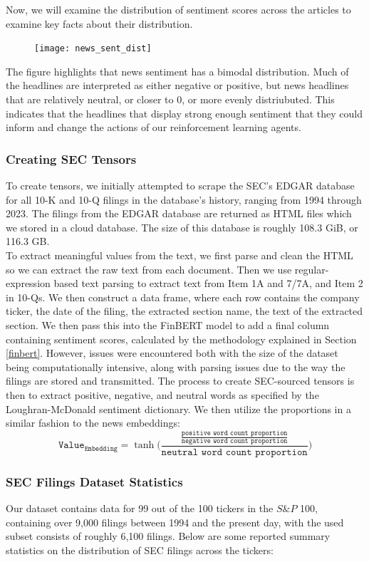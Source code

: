 Now, we will examine the distribution of sentiment scores across the articles to examine key facts about their distribution.


\begin{figure}
\texttt{[image: news\_sent\_dist]}
\end{figure}

The figure highlights that news sentiment has a bimodal distribution. Much of the headlines are interpreted as either negative or positive, but news headlines that are relatively neutral, or closer to 0, or more evenly distriubuted. 
This indicates that the headlines that display strong enough sentiment that they could inform and change the actions of our reinforcement learning agents.

\subsubsection{Creating SEC Tensors}
To create tensors, we initially attempted to scrape the SEC's EDGAR database for all 10-K and 10-Q filings in the database's history, ranging from 1994 through 2023. The filings from the EDGAR database are returned as HTML files which we stored in a cloud database. The size of this database is roughly 108.3 GiB, or 116.3 GB.\\
To extract meaningful values from the text, we first parse and clean the HTML so we can extract the raw text from each document. Then we use regular-expression based text parsing to extract text from Item 1A and 7/7A, and Item 2 in 10-Qs. We then construct a data frame, where each row contains the company ticker, the date of the filing, the extracted section name, the text of the extracted section. We then pass this into the FinBERT model to add a final column containing sentiment scores, calculated by the methodology explained in Section \ref{finbert}. However, issues were encountered both with the size of the dataset being computationally intensive, along with parsing issues due to the way the filings are stored and transmitted.
The process to create SEC-sourced tensors is then to extract positive, negative, and neutral words as specified by the Loughran-McDonald sentiment dictionary. We then utilize the proportions in a similar fashion to the news embeddings:
\[\texttt{Value}_{\texttt{Embedding}} = \tanh\Biggl( \frac{\frac{\texttt{positive word count proportion}}{\texttt{negative word count proportion}}}{\texttt{neutral word count proportion}} \Biggr)\]
\subsubsection{SEC Filings Dataset Statistics}
Our dataset contains data for 99 out of the 100 tickers in the $S\&P$ 100, containing over 9,000 filings between 1994 and the present day, with the used subset consists of roughly 6,100 filings. Below are some reported summary statistics on the distribution of SEC filings across the tickers:

